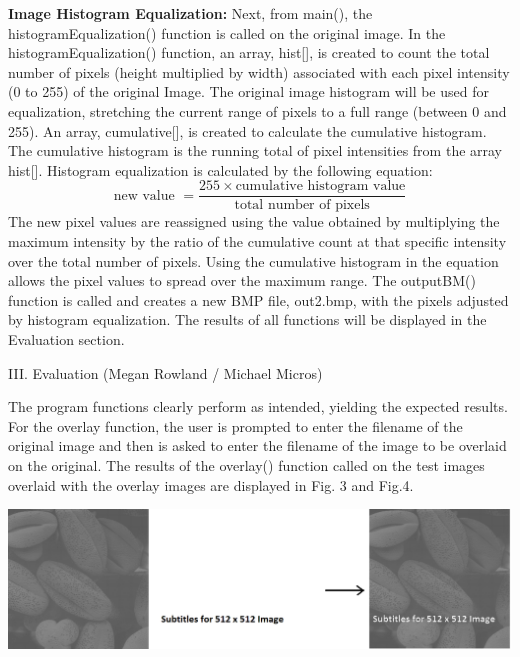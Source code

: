 \documentclass{article}
\newenvironment{Figure}
  {\par\medskip\noindent\ignorespaces\minipage{\linewidth}}
  {\endminipage\par\medskip}
\begin{document}
\begin{multicols*}{2}
{\bf Image Histogram Equalization:}
Next, from main(), the histogramEqualization() function is called on the original image. In the histogramEqualization() function, an array, hist[], is created to count the total number of pixels (height multiplied by width) associated with each pixel intensity (0 to 255) of the original Image. The original image histogram will be used for equalization, stretching the current range of pixels to a full range (between 0 and 255).  An array, cumulative[], is created to calculate the cumulative histogram. The cumulative histogram is the running total of pixel intensities from the array hist[]. Histogram equalization is calculated by the following equation:\\
\[ \text{new value }=  \frac{255\times\text{cumulative histogram value}}{\text{total number of pixels}} \] 
The new pixel values are reassigned using the value obtained by multiplying the maximum intensity by the ratio of the cumulative count at that specific intensity over the total number of pixels. Using the cumulative histogram in the equation allows the pixel values to spread over the maximum range. 
The outputBM() function is called and creates a new BMP file, out2.bmp, with the pixels adjusted by histogram equalization. The results of all functions will be displayed in the Evaluation section.




\begin{center}
{\large III. Evaluation (Megan Rowland / Michael Micros)}\\
\end{center}

The program functions clearly perform as intended, yielding the expected results. For the overlay function, the user is prompted to enter the filename of the original image and then is asked to enter the filename of the image to be overlaid on the original. The results of the overlay() function called on  the test images overlaid with the overlay images are displayed in Fig. 3  and Fig.4.


\begin{Figure}
 \centering
 \includegraphics[width=\linewidth]{sample1.png}
\end{Figure}



\end{multicols*}
\end{document}
